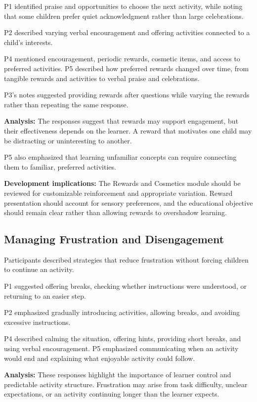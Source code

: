 \documentclass[12pt, titlepage]{article}
\begin{document}
P1 identified praise and opportunities to choose the next activity, while noting that some children prefer quiet acknowledgment rather than large celebrations.

P2 described varying verbal encouragement and offering activities connected to a child's interests.

P4 mentioned encouragement, periodic rewards, cosmetic items, and access to preferred activities. P5 described how preferred rewards changed over time, from tangible rewards and activities to verbal praise and celebrations.

P3's notes suggested providing rewards after questions while varying the rewards rather than repeating the same response.

\noindent\textbf{Analysis:} The responses suggest that rewards may support engagement, but their effectiveness depends on the learner. A reward that motivates one child may be distracting or uninteresting to another.

P5 also emphasized that learning unfamiliar concepts can require connecting them to familiar, preferred activities.

\noindent\textbf{Development implications:} The Rewards and Cosmetics module should be reviewed for customizable reinforcement and appropriate variation. Reward presentation should account for sensory preferences, and the educational objective should remain clear rather than allowing rewards to overshadow learning.

\subsection{Managing Frustration and Disengagement}

Participants described strategies that reduce frustration without forcing children to continue an activity.

P1 suggested offering breaks, checking whether instructions were understood, or returning to an easier step.

P2 emphasized gradually introducing activities, allowing breaks, and avoiding excessive instructions.

P4 described calming the situation, offering hints, providing short breaks, and using verbal encouragement. P5 emphasized communicating when an activity would end and explaining what enjoyable activity could follow.

\noindent\textbf{Analysis:} These responses highlight the importance of learner control and predictable activity structure. Frustration may arise from task difficulty, unclear expectations, or an activity continuing longer than the learner expects.
\end{document}
